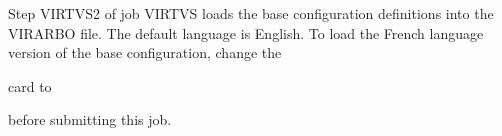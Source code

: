 \documentclass[letterpaper,10pt,english]{sphinxmanual}
\begin{document}

Step VIRTVS2 of job VIRTVS loads the base configuration definitions into the VIRARBO file. The default language is English. To load the French language version of the base configuration, change the

\begin{sphinxVerbatim}[commandchars=\\\{\}]
  
\end{sphinxVerbatim}

card to

\begin{sphinxVerbatim}[commandchars=\\\{\}]
  
\end{sphinxVerbatim}

before submitting this job.
\end{document}

